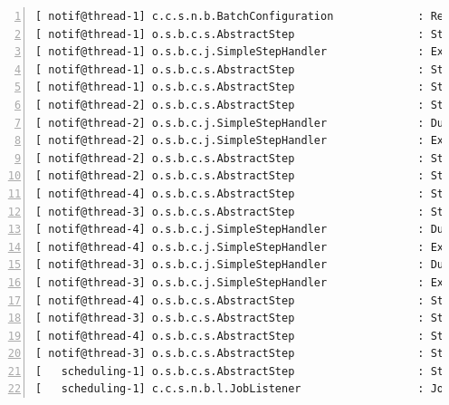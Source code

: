 \begin{lstlisting}[style=DOS,numbers=left,language=tex, deletekeywords={for,source,test}, morekeywords={certains, logs, sont, omis, par, souci, de, concision}]
[ notif@thread-1] c.c.s.n.b.BatchConfiguration             : Reading file : C:/arkeviavars/inprogress/client2.csv
[ notif@thread-1] o.s.b.c.s.AbstractStep                   : Step: [csv-processor] executed in 963ms
[ notif@thread-1] o.s.b.c.j.SimpleStepHandler              : Executing step: [csv-archiver]
[ notif@thread-1] o.s.b.c.s.AbstractStep                   : Step: [csv-archiver] executed in 476ms
[ notif@thread-1] o.s.b.c.s.AbstractStep                   : Step: [slaveFlow:file1] executed in 4s240ms
[ notif@thread-2] o.s.b.c.s.AbstractStep                   : Step: [csv-processor] executed in 6s45ms
[ notif@thread-2] o.s.b.c.j.SimpleStepHandler              : Duplicate step [csv-archiver] detected in execution of job=[notification-manager]. If either step fails, both will be executed again on restart.
[ notif@thread-2] o.s.b.c.j.SimpleStepHandler              : Executing step: [csv-archiver]
[ notif@thread-2] o.s.b.c.s.AbstractStep                   : Step: [csv-archiver] executed in 474ms
[ notif@thread-2] o.s.b.c.s.AbstractStep                   : Step: [slaveFlow:file3] executed in 9s382ms
[ notif@thread-4] o.s.b.c.s.AbstractStep                   : Step: [csv-processor] executed in 13s281ms
[ notif@thread-3] o.s.b.c.s.AbstractStep                   : Step: [csv-processor] executed in 13s278ms
[ notif@thread-4] o.s.b.c.j.SimpleStepHandler              : Duplicate step [csv-archiver] detected in execution of job=[notification-manager]. If either step fails, both will be executed again on restart.
[ notif@thread-4] o.s.b.c.j.SimpleStepHandler              : Executing step: [csv-archiver]
[ notif@thread-3] o.s.b.c.j.SimpleStepHandler              : Duplicate step [csv-archiver] detected in execution of job=[notification-manager]. If either step fails, both will be executed again on restart.
[ notif@thread-3] o.s.b.c.j.SimpleStepHandler              : Executing step: [csv-archiver]
[ notif@thread-4] o.s.b.c.s.AbstractStep                   : Step: [csv-archiver] executed in 482ms
[ notif@thread-3] o.s.b.c.s.AbstractStep                   : Step: [csv-archiver] executed in 476ms
[ notif@thread-4] o.s.b.c.s.AbstractStep                   : Step: [slaveFlow:file2] executed in 16s647ms
[ notif@thread-3] o.s.b.c.s.AbstractStep                   : Step: [slaveFlow:file0] executed in 16s933ms
[   scheduling-1] o.s.b.c.s.AbstractStep                   : Step: [partitionStep] executed in 18s94ms
[   scheduling-1] c.c.s.n.b.l.JobListener                  : Job Finished.
\end{lstlisting}
